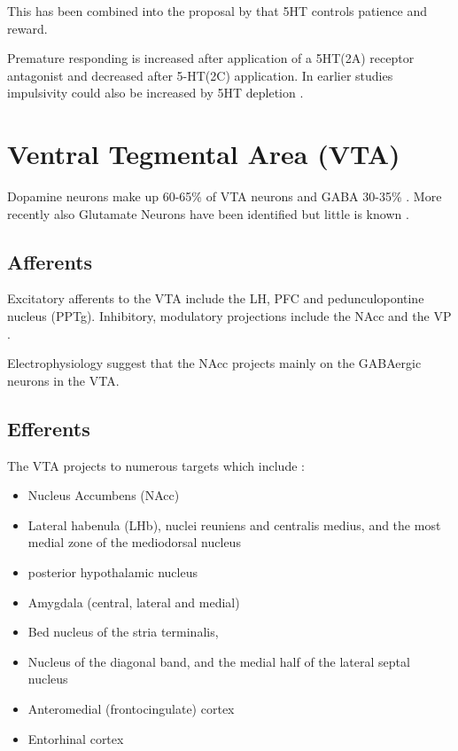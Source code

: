 \documentclass[12pt,a4paper]{article}
\begin{document}
This has been combined into the proposal by \citep{Miyazaki2012} that
5HT controls patience and reward.

Premature responding is increased after \citep{Fletcher2007}
application of a 5HT(2A) receptor antagonist and decreased after
5-HT(2C) application. In earlier studies impulsivity could also be
increased by 5HT depletion \citep{Harrison1997}.










\section{Ventral Tegmental Area (VTA)}
Dopamine neurons make up 60-65\% of VTA neurons and GABA 30-35\%
\citep{Sesack2010}. More recently also Glutamate Neurons have been
identified but little is known \citep{Morales2017}.


\subsection{Afferents}
Excitatory afferents to the VTA include the LH, PFC and pedunculopontine nucleus
(PPTg). Inhibitory, modulatory projections include the NAcc and the VP \citep{Sesack2010}.

Electrophysiology suggest that the NAcc projects mainly on the GABAergic neurons in the VTA.

\subsection{Efferents}

The VTA projects to numerous targets which include \citep{Beckstead1979}:
\begin{itemize}
  \item Nucleus Accumbens (NAcc)
  \item Lateral habenula (LHb), nuclei reuniens and centralis medius, and the most medial zone of the mediodorsal nucleus 
  \item posterior hypothalamic nucleus 
  \item Amygdala (central, lateral and medial)
  \item Bed nucleus of the stria terminalis, 
  \item Nucleus of the diagonal band, and the medial half of the lateral septal nucleus
  \item Anteromedial (frontocingulate) cortex
  \item Entorhinal cortex
\end{itemize}
\end{document}
